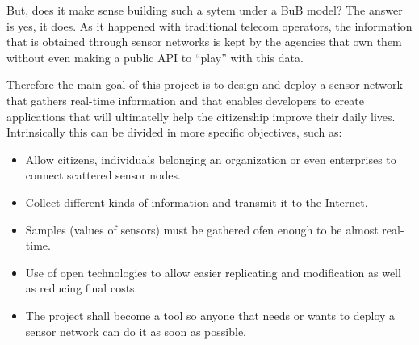 But, does it make sense building such a sytem under a BuB model? The answer is yes, it does. As it happened with traditional telecom operators, the information that is obtained through sensor networks is kept by the agencies that own them without even making a public API to ``play'' with this data.

Therefore the main goal of this project is to design and deploy a sensor network that gathers real-time information and that enables developers to create applications that will ultimatelly help the citizenship improve their daily lives. Intrinsically this can be divided in more specific objectives, such as:

\begin{itemize}
    \item Allow citizens, individuals belonging an organization or even enterprises to connect scattered sensor nodes.
    \item Collect different kinds of information and transmit it to the Internet.
    \item Samples (values of sensors) must be gathered ofen enough to be almost real-time.
    \item Use of open technologies to allow easier replicating and modification as well as reducing final costs.
    \item The project shall become a tool so anyone that needs or wants to deploy a sensor network can do it as soon as possible.
\end{itemize}


